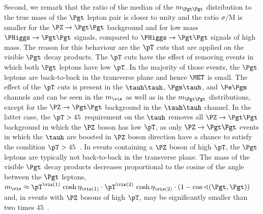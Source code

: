 {{{{{Second, we remark that the ratio of the median of the $m_{\Pgt\Pgt}$ distribution to the true mass of the $\Pgt$ lepton pair 
is closer to unity and the ratio $\sigma/\textrm{M}$ is smaller
for the $\PZ \to \Pgt\Pgt$ background and for low mass $\PHiggs \to \Pgt\Pgt$ signals, compared to $\PHiggs \to \Pgt\Pgt$ signals of high mass.
The reason for this behaviour are the $\pT$ cuts that are applied on the visible $\Pgt$ decay products.
The $\pT$ cuts have the effect of removing events in which both $\Pgt$ leptons have low $\pT$.
In the majority of those events,
the $\Pgt$ leptons are back-to-back in the transverse plane and hence $\MET$ is small.
The effect of the $\pT$ cuts is present in the $\tauh\tauh$, $\Pgm\tauh$, and $\Pe\Pgm$ channels and can be seen in the $m_{\vis}$ as well as in the $m_{\Pgt\Pgt}$ distributions,
except for the $\PZ \to \Pgt\Pgt$ background in the $\tauh\tauh$ channel.
In the latter case,
the $\pT > 45$~\GeV requirement on the $\tauh$ removes all $\PZ \to \Pgt\Pgt$ background in which the $\PZ$ boson has low $\pT$,
as only $\PZ \to \Pgt\Pgt$ events in which the $\tauh$ are boosted in $\PZ$ boson direction have a chance to satisfy the condition $\pT > 45$~\GeV.
In events containing a $\PZ$ boson of high $\pT$,
the $\Pgt$ leptons are typically not back-to-back in the transverse plane.
The mass of the visible $\Pgt$ decay products decreases proportional to the cosine of the angle between the $\Pgt$ leptons,
$m_{\vis} \approx \pT^{\vis(1)} \, \cosh\eta_{\vis(1)} \cdot \pT^{\vis(2)} \, \cosh\eta_{\vis(2)} \cdot \left( 1 - \cos\sphericalangle(\Pgt,\Pgt) \right)$
and, in events with $\PZ$ bosons of high $\pT$, may be significantly smaller than two times $45$~\GeV.

}}}}}
